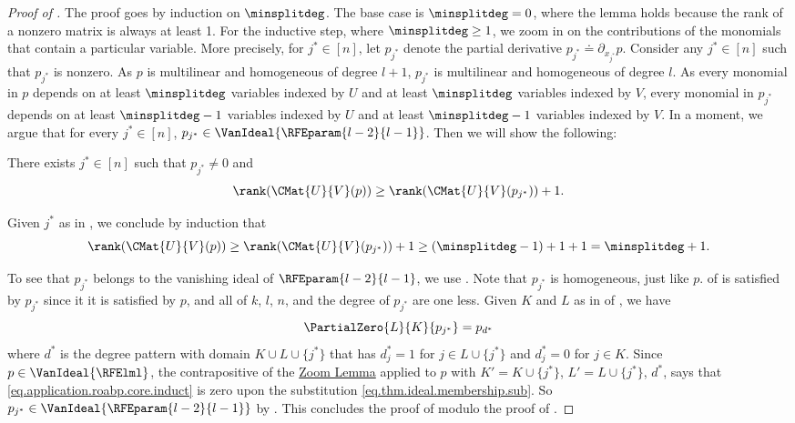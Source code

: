 \begin{proof}[Proof of ]
  The proof goes by induction on \(\minsplitdeg\).
  The base case is \(\minsplitdeg = 0\), where the lemma holds because the rank of a nonzero matrix is always at least 1.
  For the inductive step, where \(\minsplitdeg \ge 1\), we zoom in on the contributions of the monomials that contain a particular variable. More precisely, for $j^* \in [n]$,
  let $p_{j^*}$ denote the partial derivative $p_{j^*} \doteq \partial_{x_{j^*}} p$.
  Consider any $j^* \in [n]$ such that $p_{j^*}$ is nonzero.
  As $p$ is multilinear and homogeneous of degree $l+1$,
  \(p_{j^*}\) is multilinear and homogeneous of degree \(l\). As every monomial in $p$ depends on at least $\minsplitdeg$ variables indexed by \(U\) and at least \(\minsplitdeg\) variables indexed by \(V\), every monomial in \(p_{j^*}\) depends on at least \(\minsplitdeg-1\) variables indexed by \(U\) and at least \(\minsplitdeg-1\) variables indexed by \(V\).
  In a moment, we argue that for every \(j^* \in [n]\),
  \(p_{j^*}\in\VanIdeal{\RFEparam{l-2}{l-1}}\).
  Then we will show the following:
  \begin{claim}\label{claim.existence}
    There exists $j^* \in [n]$ such that $p_{j^*} \ne 0$ and
    \begin{equation} \label{eq.claim.application.roabp.core}
      \rank(\CMat{U}{V}(p)) \ge \rank(\CMat{U}{V}(p_{j^*})) + 1.
    \end{equation}
  \end{claim}
  Given \(j^*\) as in ,
  we conclude by induction that
  \[
    \rank(\CMat{U}{V}(p))
    \ge \rank(\CMat{U}{V}(p_{j^*})) + 1
    \ge (\minsplitdeg-1) + 1 + 1
    = \minsplitdeg + 1.
  \]

  To see that \(p_{j^*}\) belongs to the vanishing ideal of
  \(\RFEparam{l-2}{l-1}\),
  we use . Note that \(p_{j^*}\) is homogeneous, just like $p$.
   of
   is satisfied by \(p_{j^*}\)
  since it it is satisfied by \(p\),
  and all of $k$, $l$, $n$, and the degree of $p_{j^*}$ are one less.
  Given \(K\) and \(L\) as in
   of
  ,
  we have
  \begin{equation}\label{eq.application.roabp.core.induct}
    \PartialZero{L}{K}{p_{j^*}}
    =
    p_{d^*}
  \end{equation}
  where \(d^*\) is the degree pattern with domain \(K \cup L \cup \{j^*\}\)
  that has \(d^*_j = 1\) for \(j \in L\cup\{j^*\}\)
  and \(d^*_j = 0\) for \(j \in K\).
  Since \(p \in \VanIdeal{\RFElml}\),
  the contrapositive of the \hyperref[lem.multi-zsub-deriv]{Zoom Lemma} applied to \(p\) with
  \(K'=K\cup\{j^*\}\),
  \(L'=L\cup\{j^*\}\),
  \(d^*\),
  says that \eqref{eq.application.roabp.core.induct} is zero upon the substitution 
  \eqref{eq.thm.ideal.membership.sub}.
  So \(p_{j^*}\in\VanIdeal{\RFEparam{l-2}{l-1}}\) by
  .
  This concludes the proof of  modulo the proof of .
  \end{proof}

